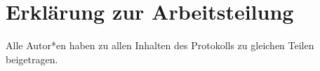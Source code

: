 \section{Erklärung zur Arbeitsteilung}
Alle Autor*en haben zu allen Inhalten des Protokolls zu gleichen Teilen beigetragen.
